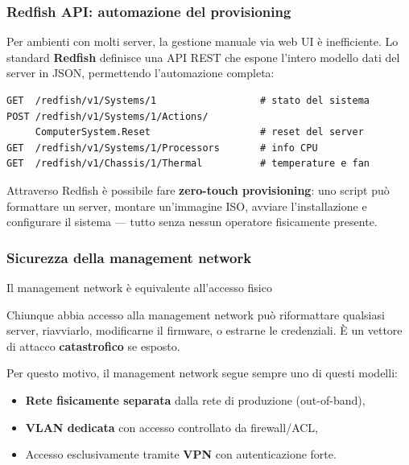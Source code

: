 \documentclass[
  italian,
  openany]{book}
\providecommand{\tightlist}{%
  \setlength{\itemsep}{0pt}\setlength{\parskip}{0pt}}
\begin{document}
\subsubsection{Redfish API: automazione del
provisioning}\label{redfish-api-automazione-del-provisioning}

Per ambienti con molti server, la gestione manuale via web UI è
inefficiente. Lo standard \textbf{Redfish} definisce una API REST che
espone l'intero modello dati del server in JSON, permettendo
l'automazione completa:

\begin{verbatim}
GET  /redfish/v1/Systems/1                  # stato del sistema
POST /redfish/v1/Systems/1/Actions/
     ComputerSystem.Reset                   # reset del server
GET  /redfish/v1/Systems/1/Processors       # info CPU
GET  /redfish/v1/Chassis/1/Thermal          # temperature e fan
\end{verbatim}

Attraverso Redfish è possibile fare \textbf{zero-touch provisioning}:
uno script può formattare un server, montare un'immagine ISO, avviare
l'installazione e configurare il sistema --- tutto senza nessun
operatore fisicamente presente.

\subsubsection{Sicurezza della management
network}\label{sicurezza-della-management-network}

\begin{calloutwarning}{Il management network è equivalente all’accesso fisico}

Chiunque abbia accesso alla management network può riformattare
qualsiasi server, riavviarlo, modificarne il firmware, o estrarne le
credenziali. È un vettore di attacco \textbf{catastrofico} se esposto.

\end{calloutwarning}

Per questo motivo, il management network segue sempre uno di questi
modelli:

\begin{itemize}
\tightlist
\item
  \textbf{Rete fisicamente separata} dalla rete di produzione
  (out-of-band),
\item
  \textbf{VLAN dedicata} con accesso controllato da firewall/ACL,
\item
  Accesso esclusivamente tramite \textbf{VPN} con autenticazione forte.
\end{itemize}
\end{document}

